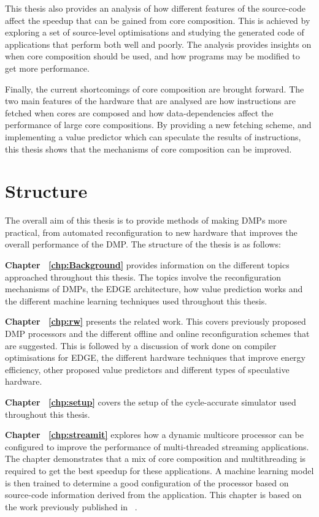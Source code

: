 This thesis also provides an analysis of how different features of the source-code affect the speedup that can be gained from core composition.
This is achieved by exploring a set of source-level optimisations and studying the generated code of applications that perform both well and poorly.
The analysis provides insights on when core composition should be used, and how programs may be modified to get more performance.

Finally, the current shortcomings of core composition are brought forward.
The two main features of the hardware that are analysed are how instructions are fetched when cores are composed and how data-dependencies affect the performance of large core compositions.
By providing a new fetching scheme, and implementing a value predictor which can speculate the results of instructions, this thesis shows that the mechanisms of core composition can be improved.


\section{Structure}
The overall aim of this thesis is to provide methods of making DMPs more practical, from automated reconfiguration to new hardware that improves the overall performance of the DMP.
The structure of the thesis is as follows:

\textbf{Chapter ~\ref{chp:Background}} provides information on the different topics approached throughout this thesis. The topics involve the reconfiguration mechanisms of DMPs, the EDGE architecture, how value prediction works and the different machine learning techniques used throughout this thesis.

\textbf{Chapter ~\ref{chp:rw}} presents the related work. This covers previously proposed DMP processors and the different offline and online reconfiguration schemes that are suggested. 
This is followed by a discussion of work done on compiler optimisations for EDGE, the different hardware techniques that improve energy efficiency, other proposed value predictors and different types of speculative hardware.

\textbf{Chapter ~\ref{chp:setup}} covers the setup of the cycle-accurate simulator used throughout this thesis.

\textbf{Chapter ~\ref{chp:streamit}} explores how a dynamic multicore processor can be configured to improve the performance of multi-threaded streaming applications.
The chapter demonstrates that a mix of core composition and multithreading is required to get the best speedup for these applications.
A machine learning model is then trained to determine a good configuration of the processor based on source-code information derived from the application.
This chapter is based on the work previously published in ~\cite{micolet2016dmpstream}.

